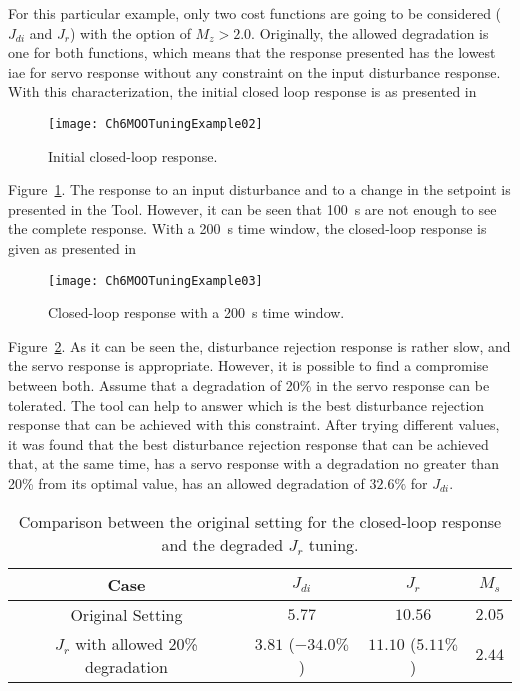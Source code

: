 For this particular example, only two cost functions are going to be considered ($J_{di}$ and $J_r$) with the option of $M_z > 2.0$. Originally, the allowed degradation is one for both functions, which means that the response presented has the lowest \gls{iae} for servo response without any constraint on the input disturbance response. With this characterization, the initial closed loop response is as presented in
%
\begin{figure}[tb]
	\centering
	\texttt{[image: Ch6MOOTuningExample02]}
	\caption{Initial closed-loop response.}
	\label{fig:Ch6MOOTuningExample02}
\end{figure}
%
Figure~\ref{fig:Ch6MOOTuningExample02}. The response to an input disturbance and to a change in the setpoint is presented in the Tool. However, it can be seen that \SI{100}{\second} are not enough to see the complete response. With a \SI{200}{\second} time window, the closed-loop response is given as presented in %
\begin{figure}
	\centering
	\texttt{[image: Ch6MOOTuningExample03]}
	\caption{Closed-loop response with a \SI{200}{\second} time window.}
	\label{fig:Ch6MOOTuningExample03}
\end{figure}
%
Figure~\ref{fig:Ch6MOOTuningExample03}. As it can be seen the, disturbance rejection response is rather slow, and the servo response is appropriate. However, it is possible to find a compromise between both. Assume that a degradation of 20\% in the servo response can be tolerated. The tool can help to answer which is the best disturbance rejection response that can be achieved with this constraint. After trying different values, it was found that the best disturbance rejection response that can be achieved that, at the same time, has a servo response with a degradation no greater than 20\% from its optimal value, has an allowed degradation of $32.6\%$ for $J_{di}$.%
%
\begin{table}[tb]
	\centering
	\begin{tabular}{cccc}
		\toprule
		Case & $J_{di}$ & $J_{r}$ & $M_s$\\
		\midrule
		Original Setting & $5.77$ & $10.56$ & $2.05$\\
		$J_r$ with allowed 20\% degradation & $3.81$ ($-34.0\%$) & $11.10$ ($5.11\%$) & $2.44$\\
		\bottomrule
	\end{tabular}
	\caption{Comparison between the original setting for the closed-loop response and the degraded $J_r$ tuning.}
	\label{tab:ExampleMOOTuning}
\end{table}

